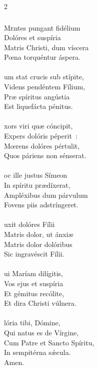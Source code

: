 \documentclass[9pt,twoside]{extarticle}
\begin{document}
\begin{multicols}{2}
{{\subsubsection*{\center {}}
\lettrine{M}entes pungant fidélium\\
Dolóres et suspíria\\
Matris Christi, dum víscera\\
Pœna torquéntur áspera.\\
\\
um stat crucis sub stípite,\\
Videns pendéntem Fílium,\\
Præ spíritus angústia\\
Est liquefácta pénitus.\\
\\
xors viri quæ cóncipit,\\
Expers dolóris péperit~:\\
Mœrens dolóres pértulit,\\
Quos páriens non sénserat.\\
\\
oc ille justus Símeon\\
In spíritu prædíxerat,\\
Ampléxibus dum párvulum\\
Fovens piis adstríngeret.\\
\\
uxit dolóres Fílii\\
Matris dolor, ut ánxiæ\\
Matris dolor dolóribus\\
Sic ingravéscit Fílii.\\
\\
ui Maríam dilígitis,\\
Vos ejus et suspíria\\
Et gémitus recólite,\\
Et dira Christi vúlnera.\\
\\
lória tibi, Dómine,\\
Qui natus es de Vírgine,\\
Cum Patre et Sancto Spíritu,\\
In sempitérna sǽcula.\\
Amen.

}}
\end{multicols}
\end{document}
